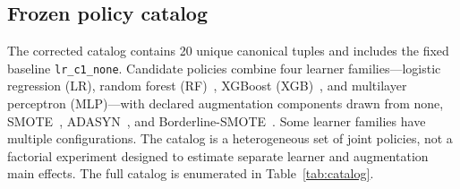 \documentclass[referee]{USG}
\begin{document}
\subsection{Frozen policy catalog}
The corrected catalog contains 20 unique canonical tuples and includes the fixed baseline \texttt{lr\_c1\_none}. Candidate policies combine four learner families---logistic regression (LR), random forest (RF)~\cite{breiman2001rf}, XGBoost (XGB)~\cite{chen2016xgboost}, and multilayer perceptron (MLP)---with declared augmentation components drawn from none, SMOTE~\cite{chawla2002smote}, ADASYN~\cite{he2008adasyn}, and Borderline-SMOTE~\cite{han2005borderline}. Some learner families have multiple configurations. The catalog is a heterogeneous set of joint policies, not a factorial experiment designed to estimate separate learner and augmentation main effects. The full catalog is enumerated in Table~\ref{tab:catalog}.
\end{document}
